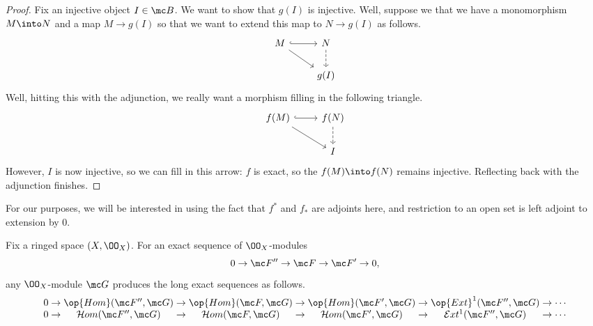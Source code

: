 \documentclass[../notes.tex]{subfiles}
\begin{document}
\begin{proof}
	Fix an injective object $I\in\mc B$. We want to show that $g(I)$ is injective. Well, suppose we that we have a monomorphism $M\into N$ and a map $M\to g(I)$ so that we want to extend this map to $N\to g(I)$ as follows.
	\[\begin{tikzcd}
		M & N \\
		& {g(I)}
		\arrow[from=1-1, to=2-2]
		\arrow[hook, from=1-1, to=1-2]
		\arrow[dashed, from=1-2, to=2-2]
	\end{tikzcd}\]
	Well, hitting this with the adjunction, we really want a morphism filling in the following triangle.
	\[\begin{tikzcd}
		{f(M)} & {f(N)} \\
		& I
		\arrow[from=1-1, to=2-2]
		\arrow[hook, from=1-1, to=1-2]
		\arrow[dashed, from=1-2, to=2-2]
	\end{tikzcd}\]
	However, $I$ is now injective, so we can fill in this arrow: $f$ is exact, so the $f(M)\into f(N)$ remains injective. Reflecting back with the adjunction finishes.
\end{proof}
For our purposes, we will be interested in using the fact that $f^*$ and $f_*$ are adjoints here, and restriction to an open set is left adjoint to extension by $0$.
\begin{proposition}
	Fix a ringed space $(X,\OO_X)$. For an exact sequence of $\OO_X$-modules
	\[0\to\mc F''\to\mc F\to\mc F'\to0,\]
	any $\OO_X$-module $\mc G$ produces the long exact sequences as follows.
	\[\arraycolsep=1.4pt\begin{array}{ccccccccccccccc}
		0 &\to& \op{Hom}(\mc F'',\mc G) &\to& \op{Hom}(\mc F,\mc G) &\to& \op{Hom}(\mc F',\mc G) &\to& \op{Ext}^1(\mc F'',\mc G) &\to& \cdots \\
		0 &\to& \mathcal Hom(\mc F'',\mc G) &\to& \mathcal Hom(\mc F,\mc G) &\to& \mathcal Hom(\mc F',\mc G) &\to& \mathcal Ext^1(\mc F'',\mc G) &\to& \cdots \\
	\end{array}\]
\end{proposition}
\end{document}

